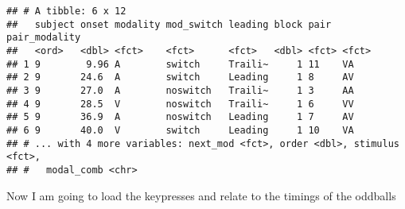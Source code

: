 \documentclass[]{article}
\begin{document}
\begin{verbatim}
## # A tibble: 6 x 12
##   subject onset modality mod_switch leading block pair  pair_modality
##   <ord>   <dbl> <fct>    <fct>      <fct>   <dbl> <fct> <fct>        
## 1 9        9.96 A        switch     Traili~     1 11    VA           
## 2 9       24.6  A        switch     Leading     1 8     AV           
## 3 9       27.0  A        noswitch   Traili~     1 3     AA           
## 4 9       28.5  V        noswitch   Traili~     1 6     VV           
## 5 9       36.9  A        noswitch   Leading     1 7     AV           
## 6 9       40.0  V        switch     Leading     1 10    VA           
## # ... with 4 more variables: next_mod <fct>, order <dbl>, stimulus <fct>,
## #   modal_comb <chr>
\end{verbatim}

Now I am going to load the keypresses and relate to the timings of the
oddballs
\end{document}
